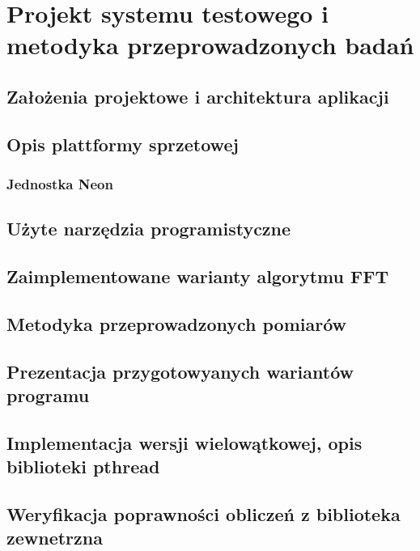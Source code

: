 \chapter{Projekt systemu testowego i metodyka przeprowadzonych badań}\label{}
\section{Założenia projektowe i architektura aplikacji}
\section{Opis plattformy sprzetowej}\label{}
\subsection{Jednostka Neon}\label{subsection:jednostkaNeon}
\section{Użyte narzędzia programistyczne}
\section{Zaimplementowane warianty algorytmu FFT}\label{section:WariantyFFTUzyteWPracy}
\section{Metodyka przeprowadzonych pomiarów}
\section{Prezentacja przygotowyanych wariantów programu}
\section{Implementacja wersji wielowątkowej, opis biblioteki pthread}
\section{Weryfikacja poprawności obliczeń z biblioteka zewnetrzna}
